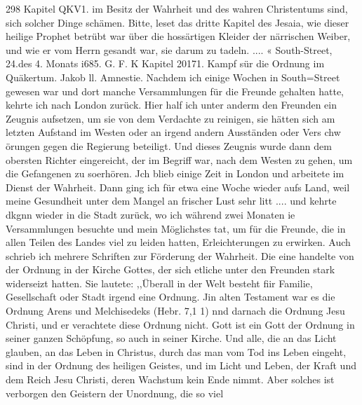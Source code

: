 298 Kapitel QKV1.
im Besitz der Wahrheit und des wahren Christentums sind, sich
solcher Dinge schämen. Bitte, leset das dritte Kapitel des Jesaia,
wie dieser heilige Prophet betrübt war über die hossärtigen Kleider
der närrischen Weiber, und wie er vom Herrn gesandt war, sie
darum zu tadeln. .... «
South-Street, 24.des 4. Monats i685. G. F.
K
Kapitel 20171.
Kampf sür die Ordnung im Quäkertum. Jakob ll. Amnestie.
Nachdem ich einige Wochen in South=Street gewesen war
und dort manche Versammlungen für die Freunde gehalten hatte,
kehrte ich nach London zurück. Hier half ich unter anderm den
Freunden ein Zeugnis aufsetzen, um sie von dem Verdachte zu
reinigen, sie hätten sich am letzten Aufstand im Westen oder an
irgend andern Ausständen oder Vers chw örungen gegen die Regierung
beteiligt. Und dieses Zeugnis wurde dann dem obersten Richter
eingereicht, der im Begriff war, nach dem Westen zu gehen, um
die Gefangenen zu soerhören.
Jch blieb einige Zeit in London und arbeitete im Dienst der
Wahrheit. Dann ging ich für etwa eine Woche wieder aufs
Land, weil meine Gesundheit unter dem Mangel an frischer Lust
sehr litt .... und kehrte dkgnn wieder in die Stadt zurück, wo
ich während zwei Monaten ie Versammlungen besuchte und mein
Möglichstes tat, um für die Freunde, die in allen Teilen des
Landes viel zu leiden hatten, Erleichterungen zu erwirken. Auch
schrieb ich mehrere Schriften zur Förderung der Wahrheit. Die
eine handelte von der Ordnung in der Kirche Gottes, der sich
etliche unter den Freunden stark widerseizt hatten. Sie lautete:
,,Überall in der Welt besteht fiir Familie, Gesellschaft oder Stadt
irgend eine Ordnung. Jin alten Testament war es die Ordnung
Arens und Melchisedeks (Hebr. 7,1 1) nnd darnach die Ordnung Jesu
Christi, und er verachtete diese Ordnung nicht. Gott ist ein Gott
der Ordnung in seiner ganzen Schöpfung, so auch in seiner Kirche.
Und alle, die an das Licht glauben, an das Leben in Christus,
durch das man vom Tod ins Leben eingeht, sind in der Ordnung
des heiligen Geistes, und im Licht und Leben, der Kraft und dem
Reich Jesu Christi, deren Wachstum kein Ende nimmt. Aber
solches ist verborgen den Geistern der Unordnung, die so viel



